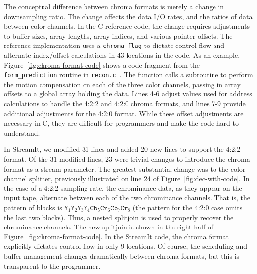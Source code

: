 The conceptual difference between chroma formats is merely a change in
downsampling ratio. The change affects the data I/O rates, and the
ratios of data between color channels. In the C reference code, the
change requires adjustments to buffer sizes, array lengths, array
indices, and various pointer offsets. The reference implementation
uses a \texttt{chroma flag} to {\newpage\noindent}dictate control flow and alternate
index/offset calculations in 43 locations in the code. As an example,
Figure~\ref{fig:chroma-format-code} shows a code fragment from the
\texttt{form\_prediction} routine in
\texttt{recon.c}~\cite{reference-mpeg-c}. The function calls a
subroutine to perform the motion compensation on each of the three
color channels, passing in array offsets to a global array holding the
data. Lines 4-6 adjust values used for address calculations to handle
the 4:2:2 and 4:2:0 chroma formats, and lines 7-9 provide additional
adjustments for the 4:2:0 format. While these offset adjustments are
necessary in C, they are difficult for programmers and make the code
hard to understand.

In StreamIt, we modified 31 lines and added 20 new lines to support
the 4:2:2 format. Of the 31 modified lines, 23 were trivial changes to
introduce the chroma format as a stream parameter. The greatest
substantial change was to the color channel splitter, previously
illustrated on line 24 of Figure~\ref{fig:dec-with-code}. In the case
of a 4:2:2 sampling rate, the chrominance data, as they appear on the
input tape, alternate between each of the two chrominance
channels. That is, the pattern of blocks is $\texttt{Y}_1 \texttt{Y}_2
\texttt{Y}_3 \texttt{Y}_4 \texttt{Cb}_5 \texttt{Cr}_6 \texttt{Cb}_7
\texttt{Cr}_8$ (the pattern for the 4:2:0 case omits the last two
blocks). Thus, a nested splitjoin is used to properly recover the
chrominance channels. The new splitjoin is shown in the right half of
Figure~\ref{fig:chroma-format-code}.  In the StreamIt code, the chroma
format explicitly dictates control flow in only 9 locations. Of
course, the scheduling and buffer management changes dramatically
between chroma formats, but this is transparent to the programmer.

